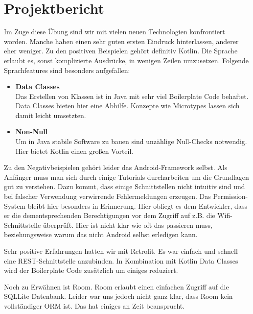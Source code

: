 \section{Projektbericht}

Im Zuge diese Übung sind wir mit vielen neuen Technologien konfrontiert worden. Manche haben einen sehr guten ersten Eindruck hinterlassen, anderer eher weniger. Zu den positiven Beispielen gehört definitiv Kotlin. Die Sprache erlaubt es, sonst komplizierte Ausdrücke, in wenigen Zeilen umzusetzen. Folgende Sprachfeatures sind besonders aufgefallen:
\begin{itemize}
	\item \textbf{Data Classes} \\
	Das Erstellen von Klassen ist in Java mit sehr viel Boilerplate Code behaftet. Data Classes bieten hier eine Abhilfe. Konzepte wie Microtypes lassen sich damit leicht umsetzten.

	\item \textbf{Non-Null} \\
	Um in Java stabile Software zu bauen sind unzählige Null-Checks notwendig. Hier bietet Kotlin einen großen Vorteil.
\end{itemize}

Zu den Negativbeispielen gehört leider das Android-Framework selbst. Als Anfänger muss man sich durch einige Tutorials durcharbeiten um die Grundlagen gut zu verstehen. Dazu kommt, dass einige Schnittstellen nicht intuitiv sind und bei falscher Verwendung verwirrende Fehlermeldungen erzeugen. Das Permission-System bleibt hier besonders in Erinnerung. Hier obliegt es dem Entwickler, dass er die dementsprechenden Berechtigungen vor dem Zugriff auf z.B. die Wifi-Schnittstelle überprüft. Hier ist nicht klar wie oft das passieren muss, beziehungsweise warum das nicht Android selbst erledigen kann. 

Sehr positive Erfahrungen hatten wir mit Retrofit. Es war einfach und schnell eine REST-Schnittstelle anzubinden. In Kombination mit Kotlin Data Classes wird der Boilerplate Code zusätzlich um einiges reduziert.

Noch zu Erwähnen ist Room. Room erlaubt einen einfachen Zugriff auf die SQLLite Datenbank. Leider war uns jedoch nicht ganz klar, dass Room kein vollständiger ORM ist. Das hat einiges an Zeit beansprucht.

\begin{comment}
	Kotlin
	 - gute Erfahrung, interessante Sprache, vieles ist einfacher zu schreiben (data classes), Coroutines
	Android
	 - steile Lernkurve,  viele Sachen sind nicht intuitiv (Permissions), Exceptions vom Framework sind oft nichtsagend
	 Room
	 - Room ist kein ORM!!
	 Retrofit
	 - TOP, es ist sehr leicht, dass man eine WebAPI anbindet
\end{comment}